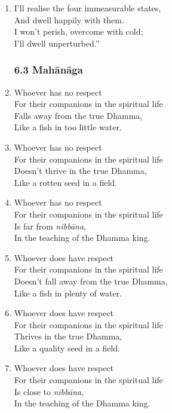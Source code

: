 \documentclass[10pt, openany]{book}
\newcommand*{\vleftofline}[1]{\leavevmode\llap{#1}}
\begin{document}
\begin{enumerate}
\item \vleftofline{“}I’ll realise the four immeasurable states,\\
And dwell happily with them.\\
I won’t perish, overcome with cold;\\
I’ll dwell unperturbed.”

\subsubsection*{6.3 Mahānāga}

\item Whoever has no respect\\
For their companions in the spiritual life\\
Falls away from the true Dhamma,\\
Like a fish in too little water.

\item Whoever has no respect\\
For their companions in the spiritual life\\
Doesn’t thrive in the true Dhamma,\\
Like a rotten seed in a field.

\item Whoever has no respect\\
For their companions in the spiritual life\\
Is far from \emph{nibbāna},\\
In the teaching of the Dhamma king.

\item Whoever does have respect\\
For their companions in the spiritual life\\
Doesn’t fall away from the true Dhamma,\\
Like a fish in plenty of water.

\item Whoever does have respect\\
For their companions in the spiritual life\\
Thrives in the true Dhamma,\\
Like a quality seed in a field.

\item Whoever does have respect\\
For their companions in the spiritual life\\
Is close to \emph{nibbāna},\\
In the teaching of the Dhamma king.


\end{enumerate}
\end{document}
